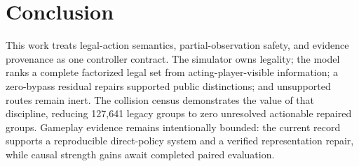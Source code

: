 \section{Conclusion}

This work treats legal-action semantics, partial-observation safety, and
evidence provenance as one controller contract. The simulator owns legality;
the model ranks a complete factorized legal set from acting-player-visible
information; a zero-bypass residual repairs supported public distinctions; and
unsupported routes remain inert. The collision census demonstrates the value
of that discipline, reducing 127,641 legacy groups to zero unresolved
actionable repaired groups. Gameplay evidence remains intentionally bounded:
the current record supports a reproducible direct-policy system and a verified
representation repair, while causal strength gains await completed paired
evaluation.

